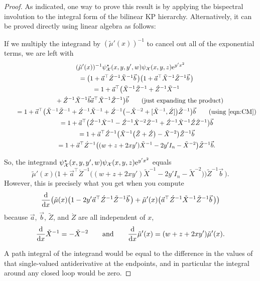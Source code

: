 \documentclass[pdftex]{sigma}
\numberwithin{equation}{section}
\theoremstyle{definition}
\def\psistar{\psi^{\star}}
\def\X{\mathcal{X}}
\begin{document}
\begin{proof}
As indicated, one way to prove this result is by applying the
bispectral involution to the integral form of the bilinear KP
hierarchy. Alternatively, it can be proved directly using linear
algebra as follows:

 If we multiply the integrand by
$(\tilde \mu'(x))^{-1}$ to cancel out all of the exponential
terms, we are left with
\begin{gather*}
 (\tilde \mu'(x))^{-1}\psistar_{\X}(x,y,y',w) \psi_{\X}(x,y,z){\rm e}^{y'
 x^2}\\
 \qquad = \bigl(1+\vec a^{\top}\acute Z^{-1}\tilde
 X^{-1}\vec b\,\bigr)\bigl(1+\vec a^{\top}\tilde X^{-1}\tilde
 Z^{-1}\vec b\,\bigr)\\
\qquad = 1+\vec a^{\top}\bigl(\tilde X^{-1}\tilde Z^{-1}+\acute Z^{-1}\tilde
 X^{-1}\\
 \phantom{\qquad =}{}
 +\acute Z^{-1}\tilde X^{-1}\vec b\vec a^{\top}\tilde X^{-1}\tilde
 Z^{-1}\bigr)\vec b\qquad\hbox{(just expanding the product)}\\
\qquad = 1+\vec a^{\top}\bigl(\tilde X^{-1}\tilde Z^{-1}+\acute Z^{-1}\tilde
 X^{-1}+\acute Z^{-1}\bigl(-\tilde X^{-2}+[\tilde X^{-1},\acute Z]\bigr)\tilde
 Z^{-1}\bigr)\vec b\qquad\hbox{(using \eqref{eqn:CM})}\\
\qquad = 1 +\vec a^{\top}\bigl(\acute Z^{-1}\tilde X^{-1}-\acute Z^{-1} \tilde
 X^{-2}\tilde Z^{-1}+\acute Z^{-1}\tilde X^{-1}\acute Z\tilde
 Z^{-1}\bigr)\vec b\\
 \qquad = 1 +\vec a^{\top}\acute Z^{-1}\bigl(\tilde X^{-1}\bigl(\tilde Z+\acute
 Z\bigr)-\tilde X^{-2}\bigr)\tilde Z^{-1}\vec b\\
\qquad = 1+ \vec a^{\top}\acute Z^{-1}\bigl((w+z+2xy')\tilde X^{-1}-2y' I_n-\tilde
 X^{-2}\bigr)\tilde Z^{-1}\vec b.
\end{gather*}

\noindent So, the integrand $\psistar_{\X}(x,y,y',w) \psi_{\X}(x,y,z){\rm e}^{y'
 x^2}$ equals
\[
\tilde\mu'(x)\bigl(1+ \vec a^{\top}\acute Z^{-1}\bigl((w+z+2xy')\tilde X^{-1}-2y' I_n-\tilde
X^{-2}\bigr)\bigr)\tilde Z^{-1}\vec b\,\bigr).
\]
However, this is precisely what you get when you compute
\[
\frac{\rm d}{{\rm d}x}\bigl(\tilde\mu(x)\bigl(1-2y'\vec a^{\top}\acute Z^{-1}\tilde
 Z^{-1}\vec b\,\bigr)+\tilde\mu'(x)\bigl(\vec a^{\top}\acute Z^{-1}
 \tilde X^{-1}\tilde Z^{-1}\vec b\,\bigr)\bigr)
\]
because
$\vec a$, $\vec b$, $\tilde Z$, and $\acute Z$ are all independent of $x$,
\[
\frac{\rm d}{{\rm d}x}\tilde X^{-1}=-\tilde X^{-2} \qquad \text{and}\qquad
\frac{\rm d}{{\rm d}x}\tilde \mu'(x)=(w+z+2xy')\tilde \mu'(x).
\]

A path integral of the integrand would be equal to the difference in
the values of that single-valued antiderivative at the endpoints, and in particular
the integral around any closed loop would be zero.
\end{proof}
\end{document}
